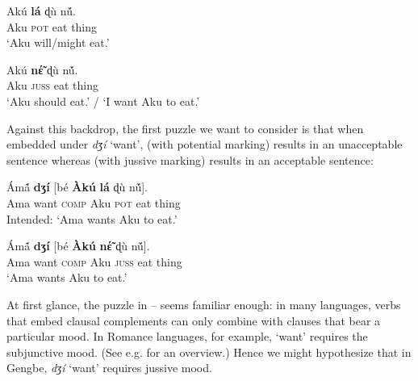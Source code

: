 \documentclass[output=paper,modfonts,nonflat]{langsci/langscibook}
\newcommand{\Z}{ʒ}
\newcommand{\D}{ɖ}
\newcommand{\á}{\'{ã}}
\newcommand{\É}{\'{\~{ε}}}
\newcommand{\È}{\`{\~{ε}}}
\newcommand{\í}{\'{\~{i}}}
\newcommand{\ì}{\`{\~{i}}}
\newcommand{\Ó}{\'{\~{ɔ}}}
\newcommand{\Ò}{\`{\~{ɔ}}}
\newcommand{\ú}{\'{ũ}}
\newcommand{\ù}{\`{ũ}}
\begin{document}
\ea \label{ex:grano:pot:7}
\gll Ak\'u \textbf{l\'a} {\D}\`u n\'{\~u}.\\
Aku \textsc{pot} eat thing\\
\glt `Aku will/might eat.' %
\z

\ea \label{ex:grano:juss:8}
\gll Ak\'u \textbf{n{\É}} {\D}\`u n\'{\~u}.\\
Aku \textsc{juss} eat thing\\
\glt`Aku should eat.' / `I want Aku to eat.' %
\z

Against this backdrop, the first puzzle we want to consider is that when embedded under \emph{d{\Z}\'i} `want',  (with potential marking) results in an unacceptable sentence whereas  (with jussive marking) results in an acceptable sentence:

\ea \label{ex:grano:wall:9}
\gll *\'Am\'{\~a} \textbf{d{\Z}\'i} [b\'e \textbf{\`Ak\'u} \textbf{l\'a} {\D}\`u n\'{\~u}].\\
Ama want \textsc{comp} Aku \textsc{pot} eat thing\\
\glt Intended: `Ama wants Aku to eat.' %
\z

\ea \label{ex:grano:wan:10}
\gll \'Am\'{\~a} \textbf{d{\Z}\'i} [b\'e \textbf{\`Ak\'u} \textbf{n{\É}} {\D}\`u n\'{\~u}].\\
Ama want \textsc{comp} Aku \textsc{juss} eat thing\\
\glt `Ama wants Aku to eat.' %
\z

At first glance, the puzzle in -- seems familiar enough: in many languages, verbs that embed clausal complements can only combine with clauses that bear a particular mood. In Romance languages, for example, `want' requires the subjunctive mood. (See e.g. \citealt{Palmer2001} for an overview.) Hence we might hypothesize that in Gengbe, \emph{d{\Z}\'i} `want' requires jussive mood. 
\end{document}
